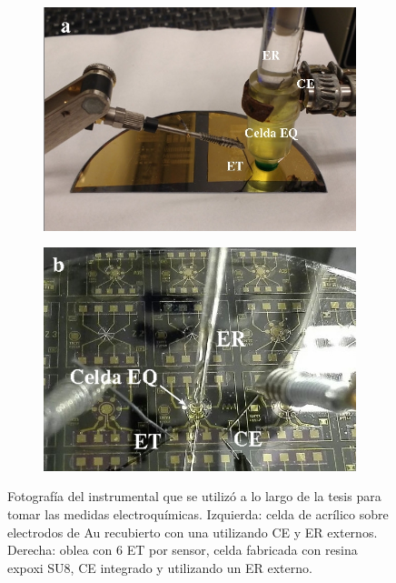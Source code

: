 					 \begin{figure}[t!]
			  		 \begin{subfigure}[t]{0.495\textwidth}
			  		  \includegraphics[width=\textwidth]{Imagenes/EQ1.jpg}
			  		  \end{subfigure}
			  		  \begin{subfigure}[t]{0.495\textwidth}
			  		  \includegraphics[width=\textwidth]{Imagenes/EQ2.jpg}
			  		  \end{subfigure}
			  \caption[Equipo para realizar la medidas electroquímicas]{Fotografía del instrumental que se utilizó a lo largo de la tesis para tomar las medidas electroquímicas. Izquierda: celda de acrílico sobre electrodos de Au recubierto con una \pdm\space utilizando CE y ER externos. Derecha: oblea con 6 ET por sensor, celda fabricada con resina expoxi SU8, CE integrado y utilizando un ER externo.}
			  		 \label{fig:celda}
			 		 \end{figure}

